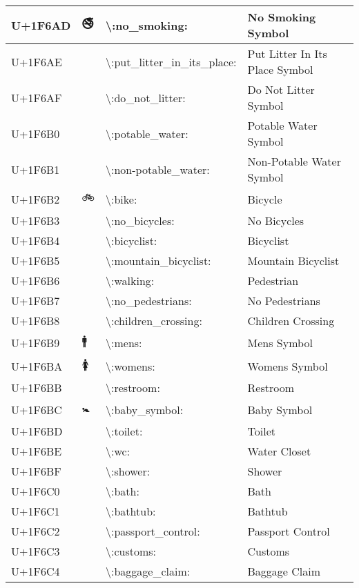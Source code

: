 \begin{table}[h]
\begin{tabulary}{\linewidth}{|L|L|L|L|}
\hline
U+1F6AD & 🚭 & {\textbackslash}:no\_smoking: & No Smoking Symbol \\
\hline
U+1F6AE & 🚮 & {\textbackslash}:put\_litter\_in\_its\_place: & Put Litter In Its Place Symbol \\
\hline
U+1F6AF & 🚯 & {\textbackslash}:do\_not\_litter: & Do Not Litter Symbol \\
\hline
U+1F6B0 & 🚰 & {\textbackslash}:potable\_water: & Potable Water Symbol \\
\hline
U+1F6B1 & 🚱 & {\textbackslash}:non-potable\_water: & Non-Potable Water Symbol \\
\hline
U+1F6B2 & 🚲 & {\textbackslash}:bike: & Bicycle \\
\hline
U+1F6B3 & 🚳 & {\textbackslash}:no\_bicycles: & No Bicycles \\
\hline
U+1F6B4 & 🚴 & {\textbackslash}:bicyclist: & Bicyclist \\
\hline
U+1F6B5 & 🚵 & {\textbackslash}:mountain\_bicyclist: & Mountain Bicyclist \\
\hline
U+1F6B6 & 🚶 & {\textbackslash}:walking: & Pedestrian \\
\hline
U+1F6B7 & 🚷 & {\textbackslash}:no\_pedestrians: & No Pedestrians \\
\hline
U+1F6B8 & 🚸 & {\textbackslash}:children\_crossing: & Children Crossing \\
\hline
U+1F6B9 & 🚹 & {\textbackslash}:mens: & Mens Symbol \\
\hline
U+1F6BA & 🚺 & {\textbackslash}:womens: & Womens Symbol \\
\hline
U+1F6BB & 🚻 & {\textbackslash}:restroom: & Restroom \\
\hline
U+1F6BC & 🚼 & {\textbackslash}:baby\_symbol: & Baby Symbol \\
\hline
U+1F6BD & 🚽 & {\textbackslash}:toilet: & Toilet \\
\hline
U+1F6BE & 🚾 & {\textbackslash}:wc: & Water Closet \\
\hline
U+1F6BF & 🚿 & {\textbackslash}:shower: & Shower \\
\hline
U+1F6C0 & 🛀 & {\textbackslash}:bath: & Bath \\
\hline
U+1F6C1 & 🛁 & {\textbackslash}:bathtub: & Bathtub \\
\hline
U+1F6C2 & 🛂 & {\textbackslash}:passport\_control: & Passport Control \\
\hline
U+1F6C3 & 🛃 & {\textbackslash}:customs: & Customs \\
\hline
U+1F6C4 & 🛄 & {\textbackslash}:baggage\_claim: & Baggage Claim \\

\end{tabulary}
\end{table}
